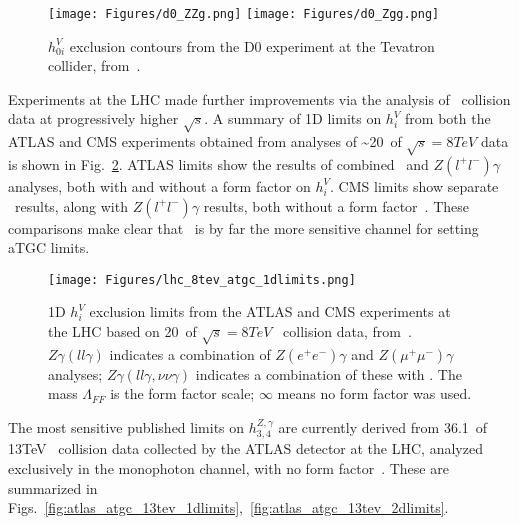 \begin{figure}[hbtp]
  \begin{center}
    \texttt{[image: Figures/d0\_ZZg.png]}
    \texttt{[image: Figures/d0\_Zgg.png]}
    \caption{
      $h_{0i}^{V}$ exclusion contours from the D0 experiment at the Tevatron collider, from~\cite{ref:PhysRevD.85.052001}.
    }
    \label{fig:d0_aTGC}
  \end{center}
\end{figure}

Experiments at the LHC made further improvements via the analysis of \Pp\Pp\ collision data at progressively higher $\sqrt{s}$.
A summary of 1D limits on $h_{i}^{V}$ from both the ATLAS and CMS experiments obtained from analyses of \textasciitilde20\fbinv\ of $\sqrt{s} = 8\unit{TeV}$ data
is shown in Fig.~\ref{fig:lhc_8tev_atgc_1dlimits}. ATLAS limits show the results of combined \zinvg\ and $Z(l^\mathrm{+}l^\mathrm{-})\gamma$
analyses, both with and without a form factor on $h_{i}^{V}$. CMS limits show separate \zinvg\ results, along with $Z(l^\mathrm{+}l^\mathrm{-})\gamma$
results, both without a form factor~\cite{ref:RevModPhys.89.035008}. These comparisons make clear that \zinvg\ is by far
the more sensitive channel for setting aTGC limits.

\begin{figure}[hbtp]
  \begin{center}
    \texttt{[image: Figures/lhc\_8tev\_atgc\_1dlimits.png]}
    \caption{
      1D $h_{i}^{V}$ exclusion limits from the ATLAS and CMS experiments at the LHC based on 20\fbinv\ of $\sqrt{s} = 8\unit{TeV}$
      \Pp\Pp\ collision data, from~\cite{ref:RevModPhys.89.035008}.
      $Z\gamma(ll\gamma)$ indicates a combination of $Z(e^\mathrm{+}e^\mathrm{-})\gamma$ and $Z(\mu^\mathrm{+}\mu^\mathrm{-})\gamma$
      analyses; $Z\gamma(ll\gamma,\nu\nu\gamma)$ indicates a combination of these with \zinvg. The mass $\Lambda_{FF}$
      is the form factor scale; $\infty$ means no form factor was used.
    }
    \label{fig:lhc_8tev_atgc_1dlimits}
  \end{center}
\end{figure}

The most sensitive published limits on $h_{3,4}^{Z,\gamma}$ are currently derived from 36.1\fbinv\ of 13\unit{TeV} \Pp\Pp\ collision
data collected by the ATLAS detector at the LHC, analyzed exclusively in the monophoton channel, with no form factor~\cite{ref:CERN-EP-2018-220}.
These are summarized in Figs.~\ref{fig:atlas_atgc_13tev_1dlimits},~\ref{fig:atlas_atgc_13tev_2dlimits}.

